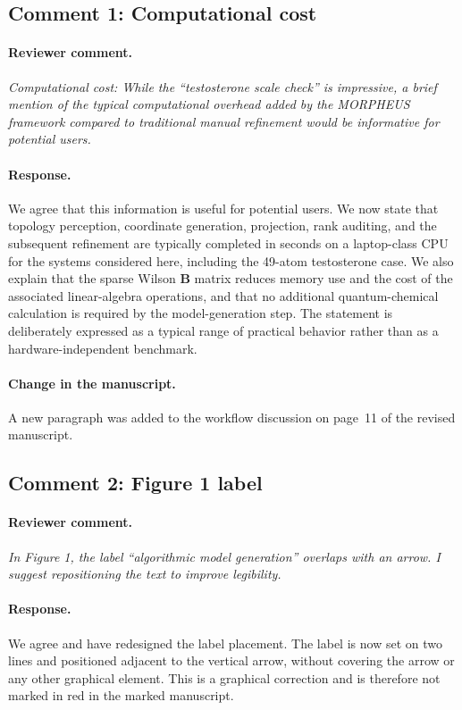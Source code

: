 \documentclass[11pt]{article}
\begin{document}
\subsection*{Comment 1: Computational cost}

\paragraph{Reviewer comment.}
\emph{Computational cost: While the ``testosterone scale check'' is impressive,
a brief mention of the typical computational overhead added by the MORPHEUS
framework compared to traditional manual refinement would be informative for
potential users.}

\paragraph{Response.}
We agree that this information is useful for potential users. We now state
that topology perception, coordinate generation, projection, rank auditing,
and the subsequent refinement are typically completed in seconds on a
laptop-class CPU for the systems considered here, including the 49-atom
testosterone case. We also explain that the sparse Wilson $\mathbf{B}$ matrix
reduces memory use and the cost of the associated linear-algebra operations,
and that no additional quantum-chemical calculation is required by the
model-generation step. The statement is deliberately expressed as a typical
range of practical behavior rather than as a hardware-independent benchmark.

\paragraph{Change in the manuscript.}
A new paragraph was added to the workflow discussion on page~11 of the
revised manuscript.

\subsection*{Comment 2: Figure 1 label}

\paragraph{Reviewer comment.}
\emph{In Figure 1, the label ``algorithmic model generation'' overlaps with an
arrow. I suggest repositioning the text to improve legibility.}

\paragraph{Response.}
We agree and have redesigned the label placement. The label is now set on two
lines and positioned adjacent to the vertical arrow, without covering the
arrow or any other graphical element. This is a graphical correction and is
therefore not marked in red in the marked manuscript.
\end{document}
